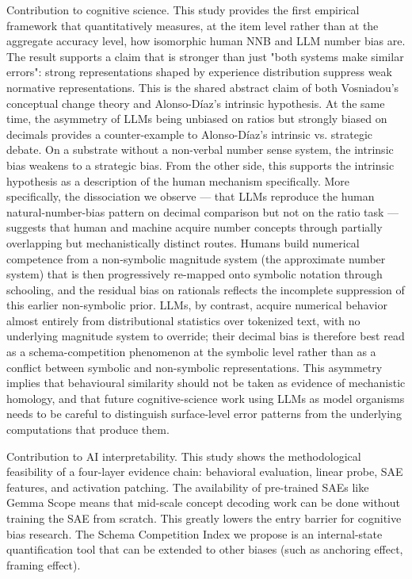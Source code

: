 Contribution to cognitive science. This study provides the first empirical framework that quantitatively measures, at the item level rather than at the aggregate accuracy level, how isomorphic human NNB and LLM number bias are. The result supports a claim that is stronger than just "both systems make similar errors": strong representations shaped by experience distribution suppress weak normative representations. This is the shared abstract claim of both Vosniadou's conceptual change theory and Alonso-Díaz's intrinsic hypothesis. At the same time, the asymmetry of LLMs being unbiased on ratios but strongly biased on decimals provides a counter-example to Alonso-Díaz's intrinsic vs. strategic debate. On a substrate without a non-verbal number sense system, the intrinsic bias weakens to a strategic bias. From the other side, this supports the intrinsic hypothesis as a description of the human mechanism specifically. More specifically, the dissociation we observe — that LLMs reproduce the human natural-number-bias pattern on decimal comparison but not on the ratio task — suggests that human and machine acquire number concepts through partially overlapping but mechanistically distinct routes. Humans build numerical competence from a non-symbolic magnitude system (the approximate number system) that is then progressively re-mapped onto symbolic notation through schooling, and the residual bias on rationals reflects the incomplete suppression of this earlier non-symbolic prior. LLMs, by contrast, acquire numerical behavior almost entirely from distributional statistics over tokenized text, with no underlying magnitude system to override; their decimal bias is therefore best read as a schema-competition phenomenon at the symbolic level rather than as a conflict between symbolic and non-symbolic representations. This asymmetry implies that behavioural similarity should not be taken as evidence of mechanistic homology, and that future cognitive-science work using LLMs as model organisms needs to be careful to distinguish surface-level error patterns from the underlying computations that produce them.

Contribution to AI interpretability. This study shows the methodological feasibility of a four-layer evidence chain: behavioral evaluation, linear probe, SAE features, and activation patching. The availability of pre-trained SAEs like Gemma Scope means that mid-scale concept decoding work can be done without training the SAE from scratch. This greatly lowers the entry barrier for cognitive bias research. The Schema Competition Index we propose is an internal-state quantification tool that can be extended to other biases (such as anchoring effect, framing effect).

